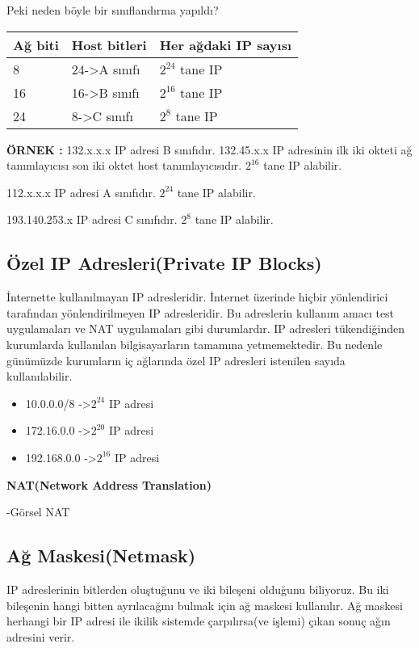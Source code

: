 Peki neden böyle bir sınıflandırma yapıldı?

\begin{tabular}{l|l|l}
Ağ biti & Host bitleri & Her ağdaki IP sayısı \\
\hline
8& 24->A sınıfı &$2^{24}$ tane IP \\
16& 16->B sınıfı &$2^{16}$ tane IP \\
24&8->C sınıfı &$2^8$ tane IP \\

\end{tabular}

\textbf{ÖRNEK : } 132.x.x.x IP adresi B sınıfıdır.
132.45.x.x IP adresinin ilk iki okteti ağ tanımlayıcısı son iki oktet host tanımlayıcısıdır. $2^16$ tane IP alabilir. 

112.x.x.x IP adresi A sınıfıdır. $2^{24}$ tane IP alabilir.

193.140.253.x IP adresi C sınıfıdır. $2^8$ tane IP alabilir.


\subsection{Özel IP Adresleri(Private IP Blocks)}

İnternette kullanılmayan IP adresleridir. İnternet üzerinde hiçbir yönlendirici tarafından yönlendirilmeyen IP adresleridir. Bu adreslerin kullanım amacı test uygulamaları ve NAT uygulamaları gibi durumlardır. IP adresleri tükendiğinden kurumlarda kullanılan bilgisayarların tamamına yetmemektedir. Bu nedenle günümüzde kurumların iç ağlarında özel IP adresleri istenilen sayıda kullanılabilir. 

\begin{itemize}
\item 10.0.0.0/8 ->$2^{24}$ IP adresi
\item 172.16.0.0 ->$2^{20}$ IP adresi
\item 192.168.0.0 ->$2^{16}$ IP adresi
\end{itemize}

\textbf{NAT(Network Address Translation)}

-Görsel NAT


\subsection{Ağ Maskesi(Netmask)}

IP adreslerinin bitlerden oluştuğunu ve iki bileşeni olduğunu biliyoruz. Bu iki bileşenin hangi bitten ayrılacağını bulmak için ağ maskesi kullanılır. Ağ maskesi herhangi bir IP adresi ile ikilik sistemde çarpılırsa(ve işlemi) çıkan sonuç ağın adresini verir. 


